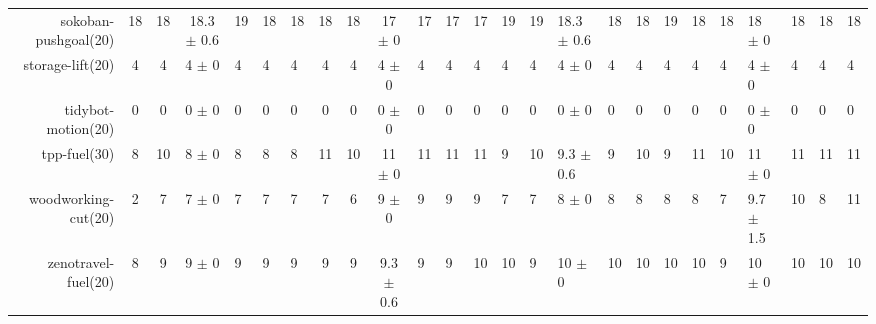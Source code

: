 \begin{center}
\begin{tabular}{|r|cccHHH|cccHHHHHHHHHHHHHHH|}
sokoban-pushgoal(20) & 18 & 18 & 18.3 $\pm$ 0.6 & 19 & 18 & 18 & 18 & 18 & 17 $\pm$ 0 & 17 & 17 & 17 & 19 & 19 & 18.3 $\pm$ 0.6 & 18 & 18 & 19 & 18 & 18 & 18 $\pm$ 0 & 18 & 18 & 18\\
storage-lift(20) & 4 & 4 & 4 $\pm$ 0 & 4 & 4 & 4 & 4 & 4 & 4 $\pm$ 0 & 4 & 4 & 4 & 4 & 4 & 4 $\pm$ 0 & 4 & 4 & 4 & 4 & 4 & 4 $\pm$ 0 & 4 & 4 & 4\\
tidybot-motion(20) & 0 & 0 & 0 $\pm$ 0 & 0 & 0 & 0 & 0 & 0 & 0 $\pm$ 0 & 0 & 0 & 0 & 0 & 0 & 0 $\pm$ 0 & 0 & 0 & 0 & 0 & 0 & 0 $\pm$ 0 & 0 & 0 & 0\\
tpp-fuel(30) & 8 & 10 & 8 $\pm$ 0 & 8 & 8 & 8 & 11 & 10 & 11 $\pm$ 0 & 11 & 11 & 11 & 9 & 10 & 9.3 $\pm$ 0.6 & 9 & 10 & 9 & 11 & 10 & 11 $\pm$ 0 & 11 & 11 & 11\\
woodworking-cut(20) & 2 & 7 & 7 $\pm$ 0 & 7 & 7 & 7 & 7 & 6 & 9 $\pm$ 0 & 9 & 9 & 9 & 7 & 7 & 8 $\pm$ 0 & 8 & 8 & 8 & 8 & 7 & 9.7 $\pm$ 1.5 & 10 & 8 & 11\\
zenotravel-fuel(20) & 8 & 9 & 9 $\pm$ 0 & 9 & 9 & 9 & 9 & 9 & 9.3 $\pm$ 0.6 & 9 & 9 & 10 & 10 & 9 & 10 $\pm$ 0 & 10 & 10 & 10 & 10 & 9 & 10 $\pm$ 0 & 10 & 10 & 10\\
\end{tabular}
\end{center}
